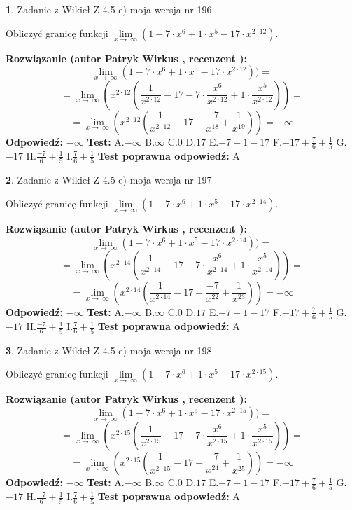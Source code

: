 \documentclass[12pt, a4paper]{article}
\theoremstyle{definition} %
\newtheorem{zad}{}
\newcommand{\zadStart}[1]{\begin{zad}#1\newline}
\newcommand{\zadStop}{\end{zad}}
\newcommand{\rozwStart}[2]{\noindent \textbf{Rozwiązanie (autor #1 , recenzent #2): }\newline}
\newcommand{\rozwStop}{\newline}
\newcommand{\odpStart}{\noindent \textbf{Odpowiedź:}\newline}
\newcommand{\odpStop}{\newline}
\newcommand{\testStart}{\noindent \textbf{Test:}\newline}
\newcommand{\testStop}{\newline}
\newcommand{\kluczStart}{\noindent \textbf{Test poprawna odpowiedź:}\newline}
\newcommand{\kluczStop}{\newline}
\begin{document}
\zadStart{Zadanie z Wikieł Z 4.5 e) moja wersja nr 196}



Obliczyć granicę funkcji  $\lim\limits_{x\to\ \infty}(1 - 7 \cdot x^{6}+1 \cdot x^{5}- 17 \cdot x^{2\cdot12})$.
\zadStop
\rozwStart{Patryk Wirkus}{}
$$\lim\limits_{x\to\ \infty}(1 - 7 \cdot x^{6}+1 \cdot x^{5}- 17 \cdot x^{2\cdot12}))=$$
$$=\lim\limits_{x\to\ \infty}(x^{2\cdot12}(\frac{1}{x^{2\cdot12}}-17 -7 \cdot \frac{x^{6}}{x^{2\cdot12}}+1 \cdot \frac{x^{5}}{x^{2\cdot12}}))=$$
$$=\lim\limits_{x\to\ \infty}(x^{2\cdot12}(\frac{1}{x^{2\cdot12}}-17 + \frac{-7}{x^{18}}+ \frac{1}{x^{19}}))=-\infty$$
\rozwStop
\odpStart
$-\infty$
\odpStop
\testStart
A.$-\infty$ B.$\infty$ C.$0$ D.$17$ E.$-7 + 1 - 17$
F.$-17+\frac{7}{6}+\frac{1}{5}$ G.$-17$
H.$\frac{-7}{6}+\frac{1}{5}$
I.$\frac{7}{6}+\frac{1}{5}$
\testStop
\kluczStart
A
\kluczStop



\zadStart{Zadanie z Wikieł Z 4.5 e) moja wersja nr 197}



Obliczyć granicę funkcji  $\lim\limits_{x\to\ \infty}(1 - 7 \cdot x^{6}+1 \cdot x^{5}- 17 \cdot x^{2\cdot14})$.
\zadStop
\rozwStart{Patryk Wirkus}{}
$$\lim\limits_{x\to\ \infty}(1 - 7 \cdot x^{6}+1 \cdot x^{5}- 17 \cdot x^{2\cdot14}))=$$
$$=\lim\limits_{x\to\ \infty}(x^{2\cdot14}(\frac{1}{x^{2\cdot14}}-17 -7 \cdot \frac{x^{6}}{x^{2\cdot14}}+1 \cdot \frac{x^{5}}{x^{2\cdot14}}))=$$
$$=\lim\limits_{x\to\ \infty}(x^{2\cdot14}(\frac{1}{x^{2\cdot14}}-17 + \frac{-7}{x^{22}}+ \frac{1}{x^{23}}))=-\infty$$
\rozwStop
\odpStart
$-\infty$
\odpStop
\testStart
A.$-\infty$ B.$\infty$ C.$0$ D.$17$ E.$-7 + 1 - 17$
F.$-17+\frac{7}{6}+\frac{1}{5}$ G.$-17$
H.$\frac{-7}{6}+\frac{1}{5}$
I.$\frac{7}{6}+\frac{1}{5}$
\testStop
\kluczStart
A
\kluczStop



\zadStart{Zadanie z Wikieł Z 4.5 e) moja wersja nr 198}



Obliczyć granicę funkcji  $\lim\limits_{x\to\ \infty}(1 - 7 \cdot x^{6}+1 \cdot x^{5}- 17 \cdot x^{2\cdot15})$.
\zadStop
\rozwStart{Patryk Wirkus}{}
$$\lim\limits_{x\to\ \infty}(1 - 7 \cdot x^{6}+1 \cdot x^{5}- 17 \cdot x^{2\cdot15}))=$$
$$=\lim\limits_{x\to\ \infty}(x^{2\cdot15}(\frac{1}{x^{2\cdot15}}-17 -7 \cdot \frac{x^{6}}{x^{2\cdot15}}+1 \cdot \frac{x^{5}}{x^{2\cdot15}}))=$$
$$=\lim\limits_{x\to\ \infty}(x^{2\cdot15}(\frac{1}{x^{2\cdot15}}-17 + \frac{-7}{x^{24}}+ \frac{1}{x^{25}}))=-\infty$$
\rozwStop
\odpStart
$-\infty$
\odpStop
\testStart
A.$-\infty$ B.$\infty$ C.$0$ D.$17$ E.$-7 + 1 - 17$
F.$-17+\frac{7}{6}+\frac{1}{5}$ G.$-17$
H.$\frac{-7}{6}+\frac{1}{5}$
I.$\frac{7}{6}+\frac{1}{5}$
\testStop
\kluczStart
A
\kluczStop
\end{document}
